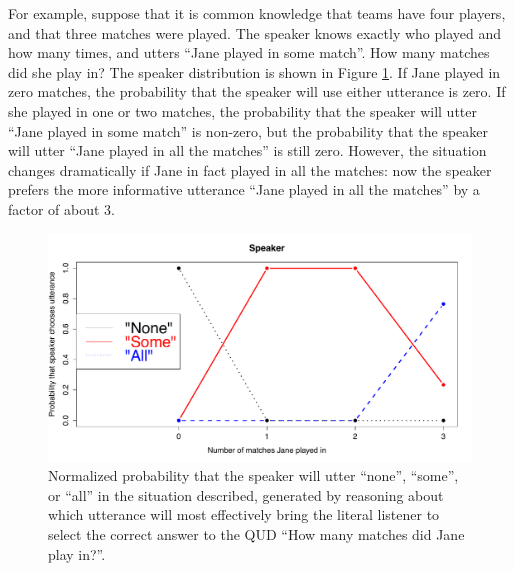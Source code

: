 \documentclass[pdfextras]{handbook}
\begin{document}
For example, suppose that it is common knowledge that teams have four players, and that three matches were played. The speaker knows exactly who played and how many times, and utters ``Jane played in some match''. How many matches did she play in? 
The speaker distribution is shown in Figure \ref{sprk-SI}. If Jane played in zero matches, the probability that the speaker will use either utterance is zero. If she played in one or two matches, the probability that the speaker will utter ``Jane played in some match'' is non-zero, but the probability that the speaker will utter ``Jane played in all the matches'' is still zero. 
However, the situation changes dramatically if Jane in fact played in all the matches: now the speaker prefers the more informative utterance ``Jane played in all the matches'' by a factor of about 3. %

\begin{figure}[tbh]
\begin{center}
\includegraphics[scale=.3]{S1.pdf}
\end{center}
\caption{Normalized probability that the speaker will utter ``none'', ``some'', or ``all'' in the situation described, generated by reasoning about which utterance will most effectively bring the literal listener to select the correct answer to the QUD ``How many matches did Jane play in?''.}
\label{sprk-SI}
\end{figure}
\end{document}
